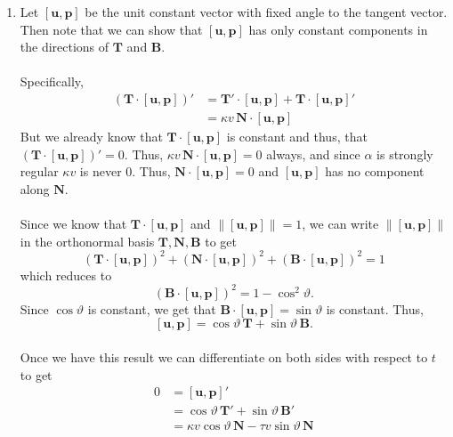 \documentclass[12 pt, letterpaper]{hmcpset}
\begin{document}
\begin{solution}
	\begin{enumerate}
		\item	Let $[\mathbf{u}, \mathbf{p}]$ be the unit constant vector with fixed angle to the tangent vector. Then note that we can show that $[\mathbf{u}, \mathbf{p}]$ has only constant components in the directions of $\mathbf{T}$ and $\mathbf{B}$. \\\\
			Specifically,
			\[
				\begin{split}
					(\mathbf{T} \cdot [\mathbf{u}, \mathbf{p}])' & = \mathbf{T}' \cdot [\mathbf{u}, \mathbf{p}] + \mathbf{T} \cdot [\mathbf{u}, \mathbf{p}]' \\
										     & = \kappa v \, \mathbf{N} \cdot [\mathbf{u}, \mathbf{p}]
				\end{split}
			\]
			But we already know that $\mathbf{T} \cdot [\mathbf{u}, \mathbf{p}]$ is constant and thus, that $(\mathbf{T} \cdot [\mathbf{u}, \mathbf{p}])' = 0$. Thus, $\kappa v \, \mathbf{N} \cdot [\mathbf{u}, \mathbf{p}] = 0$ always, and since $\alpha$ is strongly regular $\kappa v$ is never $0$. Thus, $\mathbf{N} \cdot [\mathbf{u}, \mathbf{p}] = 0$ and $[\mathbf{u}, \mathbf{p}]$ has no component along $\mathbf{N}$. \\\\
			Since we know that $\mathbf{T} \cdot [\mathbf{u}, \mathbf{p}]$ and $\lVert [\mathbf{u}, \mathbf{p}] \rVert = 1$, we can write $\lVert [\mathbf{u}, \mathbf{p}] \rVert$ in the orthonormal basis $\mathbf{T}, \mathbf{N}, \mathbf{B}$ to get
			\[
				(\mathbf{T} \cdot [\mathbf{u}, \mathbf{p}])^{2} + (\mathbf{N} \cdot [\mathbf{u}, \mathbf{p}])^{2} + (\mathbf{B} \cdot [\mathbf{u}, \mathbf{p}])^{2} = 1
			\]
			which reduces to
			\[
				(\mathbf{B} \cdot [\mathbf{u}, \mathbf{p}])^{2} = 1 - \cos^{2}{\vartheta}.
			\]
			Since $\cos{\vartheta}$ is constant, we get that $\mathbf{B} \cdot [\mathbf{u}, \mathbf{p}] = \sin{\vartheta}$ is constant. Thus,
			\[
				[\mathbf{u}, \mathbf{p}] = \cos{\vartheta} \, \mathbf{T} + \sin{\vartheta} \, \mathbf{B}.
			\] \\
			Once we have this result we can differentiate on both sides with respect to $t$ to get
			\[
				\begin{split}
					0 & = [\mathbf{u}, \mathbf{p}]' \\
					  & = \cos{\vartheta} \, \mathbf{T}' + \sin{\vartheta} \, \mathbf{B}' \\
					  & = \kappa v \cos{\vartheta} \, \mathbf{N} - \tau v \sin{\vartheta} \, \mathbf{N}

\end{split}\]
\end{enumerate}
\end{solution}
\end{document}
